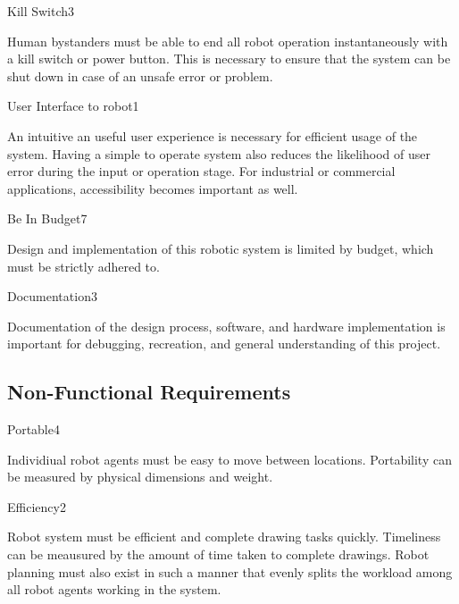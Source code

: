 \begin{functional_requirement}{Kill Switch}{3}
\item Human bystanders must be able to end all robot operation instantaneously with a kill switch or power button. This is necessary to ensure that the system can be shut down in case of an unsafe error or problem.
\end{functional_requirement}

\begin{functional_requirement}{User Interface to robot}{1}
\item An intuitive an useful user experience is necessary for efficient usage of the system. Having a simple to operate system also reduces the likelihood of user error during the input or operation stage. For industrial or commercial applications, accessibility becomes important as well. 
\end{functional_requirement}

\begin{functional_requirement}{Be In Budget}{7}
\item Design and implementation of this robotic system is limited by budget, which must be strictly adhered to.
\end{functional_requirement}

\begin{functional_requirement}{Documentation}{3}
\item Documentation of the design process, software, and hardware implementation is important for debugging, recreation, and general understanding of this project.
\end{functional_requirement}


\subsection{Non-Functional Requirements}
\label{sec:nonfunctional_requirements}

\begin{nonfunctional_requirement}{Portable}{4}
\item Individiual robot agents must be easy to move between locations. Portability can be measured by physical dimensions and weight.
\end{nonfunctional_requirement}

\begin{nonfunctional_requirement}{Efficiency}{2}
\item Robot system must be efficient and complete drawing tasks quickly. Timeliness can be meausured by the amount of time taken to complete drawings. Robot planning must also exist in such a manner that evenly splits the workload among all robot agents working in the system.
\end{nonfunctional_requirement}

